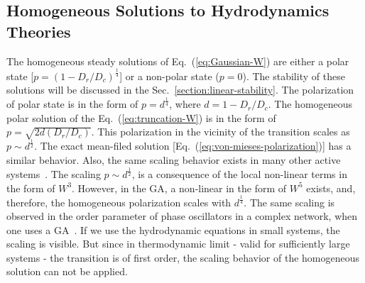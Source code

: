 \documentclass[reprint,floatfix,amsmath,amssymb,aps,pre,showkeys,showpacs,superscriptaddress]{revtex4-1}
\newcommand{\p}{p}
\newcommand{\w}{W}
\newcommand{\hl}[1]{\textcolor{hlcolor}{#1}}
\newcommand{\req}[1]{Eq.~(\ref{#1})}
\begin{document}
\subsection{Homogeneous Solutions to Hydrodynamics Theories}
\label{subsec:homogeneous}

\hl{
The homogeneous steady solutions of \req{eq:Gaussian-W} are either a polar state [$\p = (1 - D_r / D_c)^\frac{1}{4}$] or a non-polar state ($\p = 0$). The stability of these solutions will be discussed in the Sec.~\ref{section:linear-stability}. The polarization of polar state is in the form of $\p = d^\frac{1}{4}$, where $d = 1 - D_r/D_c$. The homogeneous polar solution of the \req{eq:truncation-W} is in the form of $\p=\sqrt{ 2 d (D_r / D_c)}$. This polarization in the vicinity of the transition scales as $\p \sim d^{\frac{1}{2}}$. The exact mean-filed solution [\req{eq:von-mieses-polarization}] has a similar behavior. Also, the same scaling behavior exists in many other active systems~\cite{Toner1995,Bertin2006,Bertin2009,Farrell2012,Bertin2006,Bertin2009,peruani2008mean}. The scaling $\p \sim d^{\frac{1}{2}}$, is a consequence of the local non-linear terms in the form of $\w^3$. However, in the GA, a non-linear in the form of $\w^5$ exists, and, therefore, the homogeneous polarization scales with $d^{\frac{1}{4}}$. The same scaling is observed in the order parameter of phase oscillators in a complex network, when one uses a GA~\cite{sonnenschein2013approximate,sonnenschein2013excitable,sonnenschein2014cooperative,Sonnenschein2015}. If we use the hydrodynamic equations in small systems, the scaling is visible. But since in thermodynamic limit - valid for sufficiently large systems - the transition is of first order, the scaling behavior of the homogeneous solution can not be applied.
}
\end{document}
